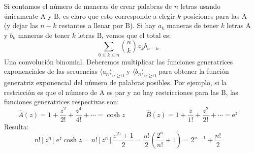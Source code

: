   Si contamos el número de maneras de crear palabras de \(n\) letras
  usando únicamente \(\mathrm{A}\) y \(\mathrm{B}\),
  es claro que esto corresponde
  a elegir \(k\) posiciones para las \(\mathrm{A}\)
  (y dejar las \(n - k\) restantes a llenar por \(\mathrm{B}\)).
  Si hay \(a_k\) maneras de tener \(k\) letras \(\mathrm{A}\)
  y \(b_k\) maneras de tener \(k\) letras \(\mathrm{B}\),
  vemos que el total es:
  \begin{equation*}
    \sum_{0 \le k \le n} \binom{n}{k} a_k b_{n - k}
  \end{equation*}
  Una convolución binomial.
  Deberemos multiplicar las funciones generatrices exponenciales
  de las secuencias \(\langle a_n \rangle_{n \ge 0}\)
  y \(\langle b_n \rangle_{n \ge 0}\)
  para obtener la función generatriz exponencial
  del número de palabras posibles.
  Por ejemplo,
  si la restricción es que el número de \(\mathrm{A}\) es par
  y no hay restricciones para las \(\mathrm{B}\),
  las funciones generatrices respectivas son:
  \begin{equation*}
    \widehat{A}(z)
      = 1 + \frac{z^2}{2!} + \frac{z^4}{4!} + \dotsb
      = \cosh z
    \hspace{3em}
    \widehat{B}(z)
      = 1 + \frac{z}{1!} + \frac{z^2}{2!} + \dotsb
      = \mathrm{e}^z
  \end{equation*}
  Resulta:
  \begin{equation*}
    n! \left[ z^n \right] \mathrm{e}^z \cosh z
      = n! \left[ z^n \right] \frac{\mathrm{e}^{2 z} + 1}{2}
      = \frac{n!}{2} \left( \frac{2^n}{n!} + 1 \right)
      = 2^{n - 1} + \frac{n!}{2}
  \end{equation*}

